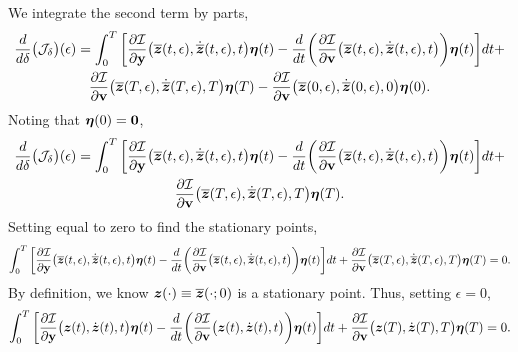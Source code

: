 \documentclass[3p,computermodern,10pt]{elsarticle}
\begin{document}
\begin{appendices}
We integrate the second term by parts,
\begin{multline*}
\frac{d}{d\delta} \big( \mathcal{J}_{\delta} \big)(\epsilon)
=  \int_0^T  \bigg[\frac{\partial \mathcal{I}  }{\partial \mathbf{y} } \big(\overline{\boldsymbol z}(t,\epsilon),\dot{\overline{\boldsymbol z}}(t,\epsilon) ,t \big) \boldsymbol \eta(t) - \frac{d}{dt}\bigg( \frac{\partial \mathcal{I}}{\partial \mathbf{{v}} }  \big(\overline{\boldsymbol z}(t,\epsilon),\dot{\overline{\boldsymbol z}}(t,\epsilon) ,t \big) \bigg) \boldsymbol \eta(t) \bigg]dt + \\ \frac{\partial \mathcal{I}}{\partial \mathbf{{v}}} \big(\overline{\boldsymbol z}(T,\epsilon),\dot{\overline{\boldsymbol z}}(T,\epsilon) ,T \big) \boldsymbol \eta(T)  - \frac{\partial \mathcal{I}}{\partial \mathbf{{v}}} \big(\overline{\boldsymbol z}(0,\epsilon),\dot{\overline{\boldsymbol z}}(0,\epsilon) ,0\big) \boldsymbol \eta(0) .
\end{multline*}
Noting that $\boldsymbol \eta(0) = \boldsymbol 0$,
\begin{multline*}
\frac{d}{d\delta} \big( \mathcal{J}_{\delta} \big)(\epsilon)
=  \int_0^T  \bigg[\frac{\partial \mathcal{I}  }{\partial \mathbf{y} } \big(\overline{\boldsymbol z}(t,\epsilon),\dot{\overline{\boldsymbol z}}(t,\epsilon) , t \big) \boldsymbol \eta(t) - \frac{d}{dt}\bigg( \frac{\partial \mathcal{I}}{\partial \mathbf{{v}} }  \big(\overline{\boldsymbol z}(t,\epsilon),\dot{\overline{\boldsymbol z}}(t,\epsilon) ,t \big) \bigg) \boldsymbol \eta(t) \bigg]dt + \\ \frac{\partial \mathcal{I}}{\partial \mathbf{{v}}} \big(\overline{\boldsymbol z}(T,\epsilon),\dot{\overline{\boldsymbol z}}(T,\epsilon) ,T \big) \boldsymbol \eta(T) . 
\end{multline*}
Setting equal to zero to find the stationary points,
$$
  \int_0^T  \bigg[\frac{\partial \mathcal{I}  }{\partial \mathbf{y} } \big(\overline{\boldsymbol z}(t,\epsilon),\dot{\overline{\boldsymbol z}}(t,\epsilon),t \big) \boldsymbol \eta(t) - \frac{d}{dt}\bigg( \frac{\partial \mathcal{I}}{\partial \mathbf{{v}} }  \big(\overline{\boldsymbol z}(t,\epsilon),\dot{\overline{\boldsymbol z}}(t,\epsilon),t \big) \bigg) \boldsymbol \eta(t) \bigg]dt + \frac{\partial \mathcal{I}}{\partial \mathbf{{v}}} \big(\overline{\boldsymbol z}(T,\epsilon),\dot{\overline{\boldsymbol z}}(T,\epsilon),T \big) \boldsymbol \eta(T)  = 0. 
$$
By definition, we know $\boldsymbol z(\cdot) \equiv \overline{\boldsymbol z}(\cdot;0)$ is a stationary point. Thus, setting $\epsilon = 0$,
 $$
  \int_0^T  \bigg[\frac{\partial \mathcal{I}  }{\partial \mathbf{y} } \big(\boldsymbol z(t),\dot{\boldsymbol z}(t),t \big) \boldsymbol \eta(t) - \frac{d}{dt}\bigg( \frac{\partial \mathcal{I}}{\partial \mathbf{{v}} }  \big(\boldsymbol z(t),\dot{\boldsymbol z}(t),t \big) \bigg) \boldsymbol \eta(t) \bigg]dt + \frac{\partial \mathcal{I}}{\partial \mathbf{{v}}} \big(\boldsymbol z(T),\dot{\boldsymbol z}(T) ,T\big) \boldsymbol \eta(T)  = 0. 
$$
\end{appendices}
\end{document}

